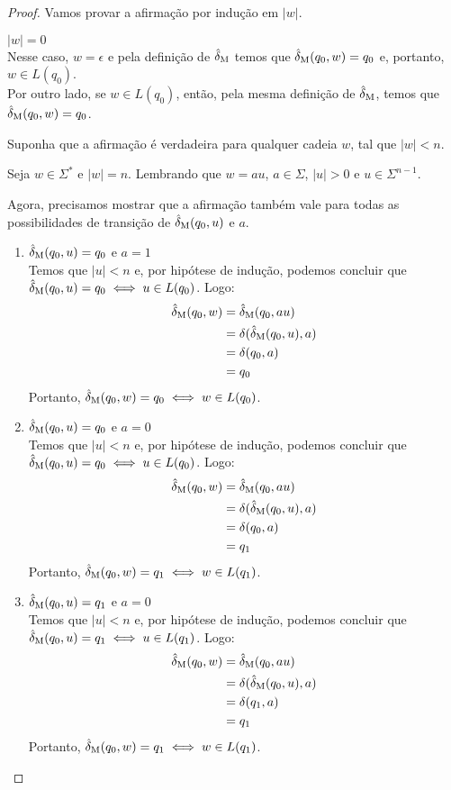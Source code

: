 \begin{proof} Vamos provar a afirmação por indução em $|w|$.

\indbase $|w| = 0$\\[3pt]
Nesse caso, $w = \epsilon$ e pela definição de $\operatorname{\hat{\delta}_M}$ temos que $\operatorname{\hat{\delta}_M}(q_0, w) = q_0$ e, portanto, $w \in L(q_0)$.\\
Por outro lado, se $w \in L(q_0)$, então, pela mesma definição de $\operatorname{\hat{\delta}_M}$, temos que $\operatorname{\hat{\delta}_M}(q_0, w) = q_0$.

\indhypo Suponha que a afirmação é verdadeira para qualquer cadeia $w$, tal que $|w| < n$.

\indstep Seja $w \in \Sigma^*$ e $|w| = n$. Lembrando que $w = au$, $a \in \Sigma$, $|u| > 0$ e $u \in \Sigma^{n - 1}$.

Agora, precisamos mostrar que a afirmação também vale para todas as possibilidades de transição de $\operatorname{\hat{\delta}_M}(q_0, u)$ e $a$.

\begin{enumerate}[label=\textbf{(\arabic*)}]
\item $\operatorname{\hat{\delta}_M}(q_0, u) = q_0$ e $a = 1$\\
Temos que $|u| < n$ e, por hipótese de indução, podemos concluir que $\operatorname{\hat{\delta}_M}(q_0, u) = q_0 \iff u \in L(q_0)$. Logo:
\begin{align*}
    \operatorname{\hat{\delta}_M}(q_0, w) &= \operatorname{\hat{\delta}_M}(q_0, au)\\
                    &= \delta(\operatorname{\hat{\delta}_M}(q_0, u), a)\\
                    &= \delta(q_0, a)\\
                    &= q_0
\end{align*}
Portanto, $\operatorname{\hat{\delta}_M}(q_0, w) = q_0 \iff w \in L(q_0)$.

\item $\operatorname{\hat{\delta}_M}(q_0, u) = q_0$ e $a = 0$\\
Temos que $|u| < n$ e, por hipótese de indução, podemos concluir que $\operatorname{\hat{\delta}_M}(q_0, u) = q_0 \iff u \in L(q_0)$. Logo:
\begin{align*}
    \operatorname{\hat{\delta}_M}(q_0, w) &= \operatorname{\hat{\delta}_M}(q_0, au)\\
                    &= \delta(\operatorname{\hat{\delta}_M}(q_0, u), a)\\
                    &= \delta(q_0, a)\\
                    &= q_1
\end{align*}
Portanto, $\operatorname{\hat{\delta}_M}(q_0, w) = q_1 \iff w \in L(q_1)$.

\item $\operatorname{\hat{\delta}_M}(q_0, u) = q_1$ e $a = 0$\\
Temos que $|u| < n$ e, por hipótese de indução, podemos concluir que $\operatorname{\hat{\delta}_M}(q_0, u) = q_1 \iff u \in L(q_1)$. Logo:
\begin{align*}
    \operatorname{\hat{\delta}_M}(q_0, w) &= \operatorname{\hat{\delta}_M}(q_0, au)\\
                    &= \delta(\operatorname{\hat{\delta}_M}(q_0, u), a)\\
                    &= \delta(q_1, a)\\
                    &= q_1
\end{align*}
Portanto, $\operatorname{\hat{\delta}_M}(q_0, w) = q_1 \iff w \in L(q_1)$.


\end{enumerate}
\end{proof}
